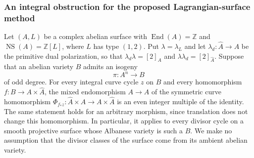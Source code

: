 \subsubsection*{An integral obstruction for the proposed Lagrangian-surface method}

Let $(A,L)$ be a complex abelian surface with
$\operatorname{End}(A)=\mathbb Z$ and
$\operatorname{NS}(A)=\mathbb Z[L]$, where $L$ has type $(1,2)$.
Put $\lambda=\lambda_L$ and let
$\lambda_d:\widehat A\to A$ be the primitive dual polarization,
so that $\lambda_d\lambda=[2]_A$ and
$\lambda\lambda_d=[2]_{\widehat A}$.
Suppose that an abelian variety $B$ admits an isogeny
\[
                     \pi:A^n\longrightarrow B
\]
of odd degree. For every integral curve cycle $z$ on $B$ and
every homomorphism $f:B\to A\times\widehat A$, the mixed
endomorphism $A\to A$ of the symmetric curve homomorphism
$\Phi_{f_*z}:\widehat A\times A\to A\times\widehat A$
is an even integer multiple of the identity. The same statement
holds for an arbitrary morphism, since translation does not change
this homomorphism. In particular, it applies to every divisor
cycle on a smooth projective surface whose Albanese variety is
such a $B$. We make no assumption that the divisor classes of
the surface come from its ambient abelian variety.

